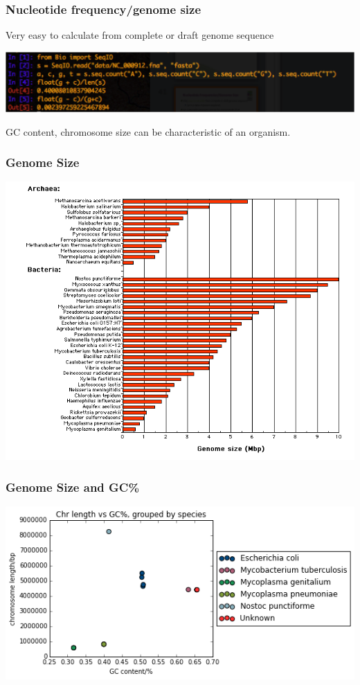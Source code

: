 %
\begin{frame}
  \frametitle{Nucleotide frequency/genome size}
  Very easy to calculate from complete or draft genome sequence \\
  \begin{center}
    \includegraphics[width=\textwidth]{images/python_gc} \\
  \end{center}  
  GC content, chromosome size can be characteristic of an organism.
\end{frame}

%
\begin{frame}
  \frametitle{Genome Size}
  \begin{center}
    \includegraphics[height=0.7\textheight]{images/genome-sizes}
  \end{center}
\end{frame}

%
\begin{frame}
  \frametitle{Genome Size and GC\%}
  \begin{center}
    \includegraphics[width=\textwidth]{images/bacteria_gc_size}
  \end{center}
\end{frame}


